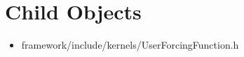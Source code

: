 \section{\label{child-objects}Child Objects}
\begin{itemize}
\item framework/include/kernels/UserForcingFunction.h
\end{itemize}
